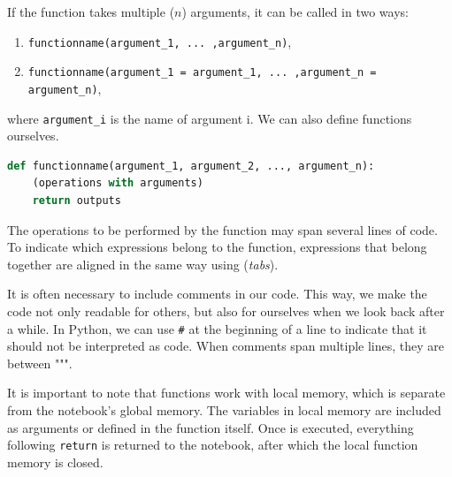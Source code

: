 If the function takes multiple ($n$) arguments, it can be called in two ways:

\begin{enumerate}
	\item \lstinline|functionname(argument_1, ... ,argument_n)|,
	\item \lstinline|functionname(argument_1 = argument_1, ... ,argument_n = argument_n)|,
\end{enumerate}
where \lstinline|argument_i| is the name of argument i. We can also define functions ourselves.

\begin{lstlisting}[language=Python]
    def functionname(argument_1, argument_2, ..., argument_n):
	(operations with arguments)
	return outputs
\end{lstlisting}

The operations to be performed by the function may span several lines of code. To indicate which expressions belong to the function, expressions that belong together are aligned in the same way using
(\textit{tabs}).

It is often necessary to include comments in our code. This way, we make the code not only readable for others, but also for ourselves when we look back after a while. In Python, we can use \lstinline|#| at the beginning of a line to indicate that it should not be interpreted as code. When comments span multiple lines, they are between """.

It is important to note that functions work with local memory, which is separate from the notebook's global memory. The variables in local memory are included as arguments or defined in the function itself. Once is executed, everything following \lstinline|return| is returned to the notebook, after which the local function memory is closed.

